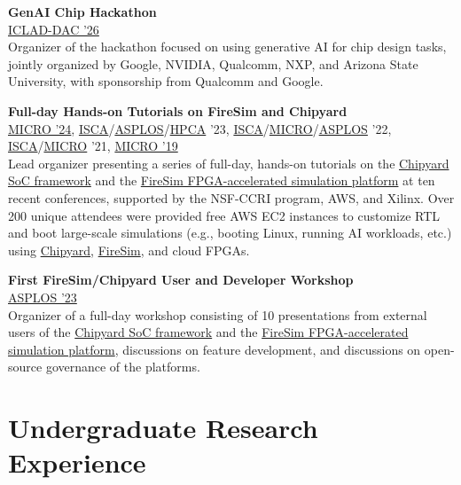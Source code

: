 \documentclass[line]{res}
\begin{document}
\begin{resume}
\textbf{GenAI Chip Hackathon}
\\
\href{https://iclad.ai/lad25-hackathon}{ICLAD-DAC '26}
\vspace{0.5mm}
\\
Organizer of the hackathon focused on using generative AI for chip design tasks, jointly organized by Google, NVIDIA, Qualcomm, NXP, and Arizona State University, with sponsorship from Qualcomm and Google.

\textbf{Full-day Hands-on Tutorials on FireSim and Chipyard}
\\
\href{https://fires.im/micro-2024-tutorial/}{MICRO '24}, \href{https://fires.im/isca-2023-tutorial/}{ISCA}/\href{https://fires.im/asplos-2023-tutorial/}{ASPLOS}/\href{https://fires.im/hpca-2023-tutorial/}{HPCA} '23, \href{https://fires.im/isca-2022-tutorial/}{ISCA}/\href{https://fires.im/micro-2022-tutorial/}{MICRO}/\href{https://fires.im/asplos-2022-tutorial/}{ASPLOS} '22, \href{https://fires.im/isca-2021-tutorial/}{ISCA}/\href{https://fires.im/micro-2021-tutorial/}{MICRO} '21, \href{https://fires.im/micro-2019-tutorial/}{MICRO '19}
\vspace{0.5mm}
\\
Lead organizer presenting a series of full-day, hands-on tutorials on the \hyperref[sec:chipyard]{Chipyard SoC framework} and the \hyperref[sec:firesim]{FireSim FPGA-accelerated simulation platform} at ten recent conferences, supported by the NSF-CCRI program, AWS, and Xilinx.
Over 200 unique attendees were provided free AWS EC2 instances to customize RTL and boot large-scale simulations (e.g., booting Linux, running AI workloads, etc.) using \hyperref[sec:chipyard]{Chipyard}, \hyperref[sec:firesim]{FireSim}, and cloud FPGAs.


\textbf{First FireSim/Chipyard User and Developer Workshop}
\\
\href{https://fires.im/workshop-2023/}{ASPLOS '23}
\vspace{0.5mm}
\\
Organizer of a full-day workshop consisting of 10 presentations from external users of the \hyperref[sec:chipyard]{Chipyard SoC framework} and the \hyperref[sec:firesim]{FireSim FPGA-accelerated simulation platform}, discussions on feature development, and discussions on open-source governance of the platforms.

\newpage

\section{\Large{Undergraduate Research Experience}}
\label{sec:ugradexp}
\vspace{2mm}


\end{resume}
\end{document}
